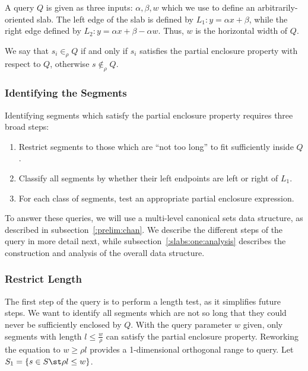 A query $Q$ is given as three inputs: $\alpha, \beta, w$ which we use to define an arbitrarily-oriented slab.
The left edge of the slab is defined by $L_1 : y = \alpha x + \beta$, while the right edge defined by $L_2: y = \alpha x + \beta - \alpha w$. 
Thus, $w$ is the horizontal width of $Q$.

We say that $s_i \in_\rho Q$ if and only if $s_i$ satisfies the partial enclosure property with respect to $Q$, otherwise $s \not \in_\rho Q$.


\subsubsection{Identifying the Segments}
\label{:slabs:one:approach}

Identifying segments which satisfy the partial enclosure property requires three broad steps:

\begin{enumerate}
 \item Restrict segments to those which are ``not too long'' to fit sufficiently inside $Q$.

 \item Classify all segments by whether their left endpoints are left or right of $L_1$.

 \item For each class of segments, test an appropriate partial enclosure expression.

\end{enumerate}

To answer these queries, we will use a multi-level canonical sets data structure, as described in subsection~\ref{:prelim:chan}. 
We describe the different steps of the query in more detail next, while subsection~\ref{:slabs:one:analysis} describes the construction and analysis of the overall data structure.


\subsubsection{Restrict Length}
\label{:slabs:one:details:restrict}

The first step of the query is to perform a length test, as it simplifies future steps.
We want to identify all segments which are not so long that they could never be sufficiently enclosed by $Q$.
With the query parameter $w$ given, only segments with length $l \leq \frac{w}{\rho}$ can satisfy the partial enclosure property.
Reworking the equation to $w \geq \rho l$ provides a 1-dimensional orthogonal range to query.
Let $S_1 = \{ s \in S \st \rho l \leq w \}$.


